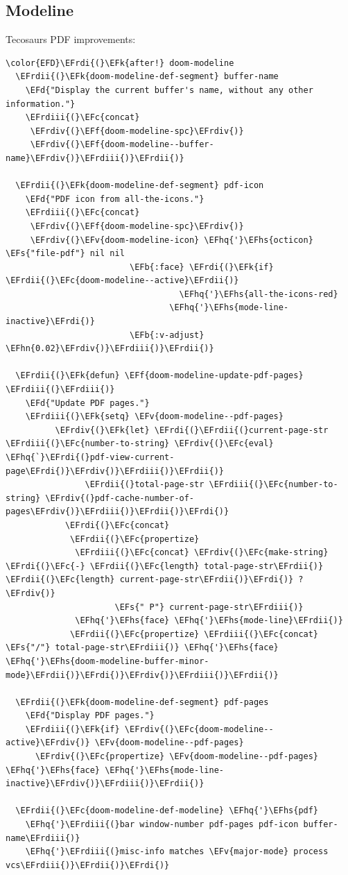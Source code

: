 \documentclass{scrartcl}
\newcommand{\EFk}[1]{\textcolor{EFk}{#1}} %
\newcommand{\EFd}[1]{\textcolor{EFd}{\textit{#1}}} %
\newcommand{\EFs}[1]{\textcolor{EFs}{#1}} %
\newcommand{\EFb}[1]{\textcolor{EFb}{#1}} %
\newcommand{\EFc}[1]{\textcolor{EFc}{#1}} %
\newcommand{\EFv}[1]{\textcolor{EFv}{#1}} %
\newcommand{\EFf}[1]{\textcolor{EFf}{#1}} %
\newcommand{\EFhn}[1]{\textcolor{EFhn}{\textbf{#1}}} %
\newcommand{\EFhq}[1]{\textcolor{EFhq}{#1}} %
\newcommand{\EFhs}[1]{\textcolor{EFhs}{#1}} %
\newcommand{\EFrdi}[1]{\textcolor{EFrdi}{#1}} %
\newcommand{\EFrdii}[1]{\textcolor{EFrdii}{#1}} %
\newcommand{\EFrdiii}[1]{\textcolor{EFrdiii}{#1}} %
\newcommand{\EFrdiv}[1]{\textcolor{EFrdiv}{#1}} %
\begin{document}
\subsection{Modeline}
\label{sec:org795b7a3}
Tecosaurs PDF improvements:
\begin{Code}
\begin{Verbatim}[]
\color{EFD}\EFrdi{(}\EFk{after!} doom-modeline
  \EFrdii{(}\EFk{doom-modeline-def-segment} buffer-name
    \EFd{"Display the current buffer's name, without any other information."}
    \EFrdiii{(}\EFc{concat}
     \EFrdiv{(}\EFf{doom-modeline-spc}\EFrdiv{)}
     \EFrdiv{(}\EFf{doom-modeline--buffer-name}\EFrdiv{)}\EFrdiii{)}\EFrdii{)}

  \EFrdii{(}\EFk{doom-modeline-def-segment} pdf-icon
    \EFd{"PDF icon from all-the-icons."}
    \EFrdiii{(}\EFc{concat}
     \EFrdiv{(}\EFf{doom-modeline-spc}\EFrdiv{)}
     \EFrdiv{(}\EFv{doom-modeline-icon} \EFhq{'}\EFhs{octicon} \EFs{"file-pdf"} nil nil
                         \EFb{:face} \EFrdi{(}\EFk{if} \EFrdii{(}\EFc{doom-modeline--active}\EFrdii{)}
                                   \EFhq{'}\EFhs{all-the-icons-red}
                                 \EFhq{'}\EFhs{mode-line-inactive}\EFrdi{)}
                         \EFb{:v-adjust} \EFhn{0.02}\EFrdiv{)}\EFrdiii{)}\EFrdii{)}

  \EFrdii{(}\EFk{defun} \EFf{doom-modeline-update-pdf-pages} \EFrdiii{(}\EFrdiii{)}
    \EFd{"Update PDF pages."}
    \EFrdiii{(}\EFk{setq} \EFv{doom-modeline--pdf-pages}
          \EFrdiv{(}\EFk{let} \EFrdi{(}\EFrdii{(}current-page-str \EFrdiii{(}\EFc{number-to-string} \EFrdiv{(}\EFc{eval} \EFhq{`}\EFrdi{(}pdf-view-current-page\EFrdi{)}\EFrdiv{)}\EFrdiii{)}\EFrdii{)}
                \EFrdii{(}total-page-str \EFrdiii{(}\EFc{number-to-string} \EFrdiv{(}pdf-cache-number-of-pages\EFrdiv{)}\EFrdiii{)}\EFrdii{)}\EFrdi{)}
            \EFrdi{(}\EFc{concat}
             \EFrdii{(}\EFc{propertize}
              \EFrdiii{(}\EFc{concat} \EFrdiv{(}\EFc{make-string} \EFrdi{(}\EFc{-} \EFrdii{(}\EFc{length} total-page-str\EFrdii{)} \EFrdii{(}\EFc{length} current-page-str\EFrdii{)}\EFrdi{)} ? \EFrdiv{)}
                      \EFs{" P"} current-page-str\EFrdiii{)}
              \EFhq{'}\EFhs{face} \EFhq{'}\EFhs{mode-line}\EFrdii{)}
             \EFrdii{(}\EFc{propertize} \EFrdiii{(}\EFc{concat} \EFs{"/"} total-page-str\EFrdiii{)} \EFhq{'}\EFhs{face} \EFhq{'}\EFhs{doom-modeline-buffer-minor-mode}\EFrdii{)}\EFrdi{)}\EFrdiv{)}\EFrdiii{)}\EFrdii{)}

  \EFrdii{(}\EFk{doom-modeline-def-segment} pdf-pages
    \EFd{"Display PDF pages."}
    \EFrdiii{(}\EFk{if} \EFrdiv{(}\EFc{doom-modeline--active}\EFrdiv{)} \EFv{doom-modeline--pdf-pages}
      \EFrdiv{(}\EFc{propertize} \EFv{doom-modeline--pdf-pages} \EFhq{'}\EFhs{face} \EFhq{'}\EFhs{mode-line-inactive}\EFrdiv{)}\EFrdiii{)}\EFrdii{)}

  \EFrdii{(}\EFc{doom-modeline-def-modeline} \EFhq{'}\EFhs{pdf}
    \EFhq{'}\EFrdiii{(}bar window-number pdf-pages pdf-icon buffer-name\EFrdiii{)}
    \EFhq{'}\EFrdiii{(}misc-info matches \EFv{major-mode} process vcs\EFrdiii{)}\EFrdii{)}\EFrdi{)}
\end{Verbatim}
\end{Code}
\end{document}
